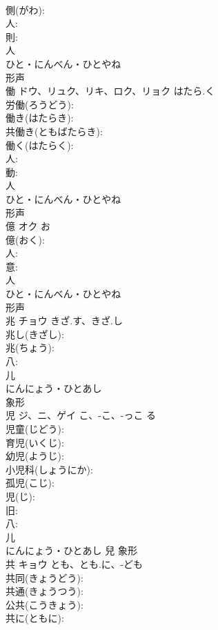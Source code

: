 \documentclass[8pt]{extreport}
\begin{document}
\begin{CJK}{UTF8}{min}
\\	側(がわ): 
\\	人: 
\\	則: 
\\	人	
\\	ひと・にんべん・ひとやね	
\\	形声 
\\	働	ドウ、リュク、リキ、ロク、リョク	はたら.く		
\\	労働(ろうどう): 
\\	働き(はたらき): 
\\	共働き(ともばたらき): 
\\	働く(はたらく): 
\\	人: 
\\	動: 
\\	人	
\\	ひと・にんべん・ひとやね	
\\	形声 
\\	億	オク		お	
\\	億(おく): 
\\	人: 
\\	意: 
\\	人	
\\	ひと・にんべん・ひとやね	
\\	形声 
\\	兆	チョウ	きざ.す、きざ.し		
\\	兆し(きざし): 
\\	兆(ちょう): 
\\	八: 
\\	儿	
\\	にんにょう・ひとあし	
\\	象形 
\\	児	ジ、ニ、ゲイ	こ、-こ、-っこ	る	
\\	児童(じどう): 
\\	育児(いくじ): 
\\	幼児(ようじ): 
\\	小児科(しょうにか): 
\\	孤児(こじ): 
\\	児(じ): 
\\	旧: 
\\	八: 
\\	儿	
\\	にんにょう・ひとあし	兒	象形 
\\	共	キョウ	とも、とも.に、-ども		
\\	共同(きょうどう): 
\\	共通(きょうつう): 
\\	公共(こうきょう): 
\\	共に(ともに): 

\end{CJK}
\end{document}
